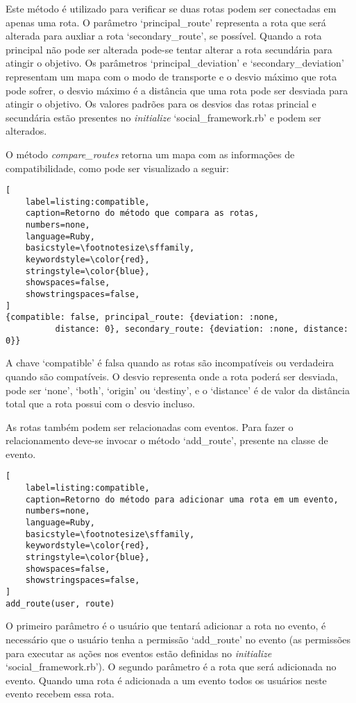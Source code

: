 Este método é utilizado para verificar se duas rotas podem ser conectadas em apenas uma rota. O parâmetro `principal\_route' representa a rota que será alterada para auxliar a rota `secondary\_route', se possível. Quando a rota principal não pode ser alterada pode-se tentar alterar a rota secundária para atingir o objetivo. Os parâmetros `principal\_deviation' e `secondary\_deviation' representam um mapa com o modo de transporte e o desvio máximo que rota pode sofrer, o desvio máximo é a distância que uma rota pode ser desviada para atingir o objetivo. Os valores padrões para os desvios das rotas princial e secundária estão presentes no \textit{initialize} `social\_framework.rb' e podem ser alterados.

O método \textit{compare\_routes} retorna um mapa com as informações de compatibilidade, como pode ser visualizado a seguir:

\begin{lstlisting}[
    label=listing:compatible,
    caption=Retorno do método que compara as rotas,
    numbers=none,
    language=Ruby,
    basicstyle=\footnotesize\sffamily,
    keywordstyle=\color{red},
    stringstyle=\color{blue},
    showspaces=false,
    showstringspaces=false,
]
{compatible: false, principal_route: {deviation: :none,
          distance: 0}, secondary_route: {deviation: :none, distance: 0}}
\end{lstlisting}

A chave `compatible' é falsa quando as rotas são incompatíveis ou verdadeira quando são compatíveis. O desvio representa onde a rota poderá ser desviada, pode ser `none', `both', `origin' ou `destiny', e o `distance' é de valor da distância total que a rota possui com o desvio incluso.

As rotas também podem ser relacionadas com eventos. Para fazer o relacionamento deve-se invocar o método `add\_route', presente na classe de evento.

\begin{lstlisting}[
    label=listing:compatible,
    caption=Retorno do método para adicionar uma rota em um evento,
    numbers=none,
    language=Ruby,
    basicstyle=\footnotesize\sffamily,
    keywordstyle=\color{red},
    stringstyle=\color{blue},
    showspaces=false,
    showstringspaces=false,
]
add_route(user, route)
\end{lstlisting}

O primeiro parâmetro é o usuário que tentará adicionar a rota no evento, é necessário que o usuário tenha a permissão `add\_route' no evento (as permissões para executar as ações nos eventos estão definidas no \textit{initialize} `social\_framework.rb'). O segundo parâmetro é a rota que será adicionada no evento. Quando uma rota é adicionada a um evento todos os usuários neste evento recebem essa rota.

